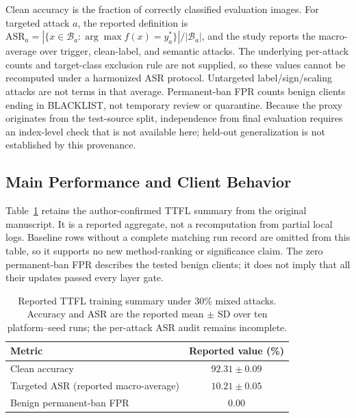 \documentclass[conference,compsoc]{IEEEtran}
\begin{document}
Clean accuracy is the fraction of correctly classified evaluation images.
For targeted attack $a$, the reported definition is
$\mathrm{ASR}_a=|\{x\in\mathcal B_a:\arg\max f(x)=y_a^*\}|/|\mathcal B_a|$,
and the study reports the macro-average over trigger, clean-label, and semantic
attacks. The underlying per-attack counts and target-class exclusion rule are
not supplied, so these values cannot be recomputed under a harmonized ASR
protocol. Untargeted label/sign/scaling attacks are not terms in that average.
Permanent-ban FPR counts benign clients ending in BLACKLIST, not temporary
review or quarantine. Because the proxy originates from the test-source split,
independence from final evaluation requires an index-level check that is not
available here; held-out generalization is not established by this provenance.

\subsection{Main Performance and Client Behavior}

Table~\ref{tab:training_summary} retains the author-confirmed TTFL summary
from the original manuscript. It is a reported aggregate, not a recomputation
from partial local logs. Baseline rows without a complete matching run record
are omitted from this table, so it supports no new method-ranking or
significance claim. The zero permanent-ban FPR describes the tested benign
clients; it does not imply that all their updates passed every layer gate.

\begin{table}[!htb]
    \centering
    \caption{Reported TTFL training summary under 30\% mixed attacks.
        Accuracy and ASR are the reported mean $\pm$ SD over ten platform--seed
        runs; the per-attack ASR audit remains incomplete.}
    \label{tab:training_summary}
    \small
    \begin{tabular}{@{}lc@{}}
        \toprule
        Metric & Reported value (\%) \\
        \midrule
        Clean accuracy & $92.31\pm0.09$ \\
        Targeted ASR (reported macro-average) & $10.21\pm0.05$ \\
        Benign permanent-ban FPR & $0.00$ \\
        \bottomrule
    \end{tabular}
\end{table}
\end{document}
